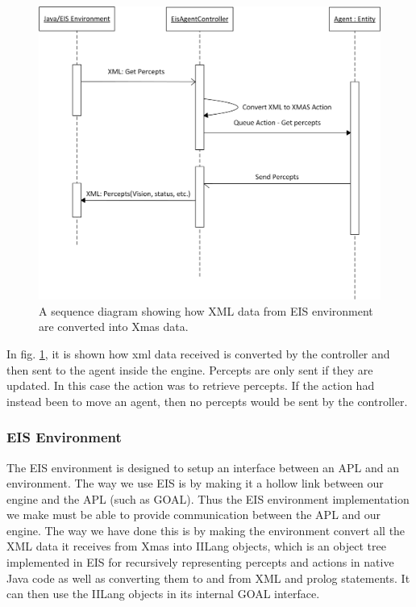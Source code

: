 \begin{figure}
\begin{centering}
\includegraphics[width=1\textwidth]{EisAgentControllerSequenceDiagram}
\par\end{centering}

\caption{A sequence diagram showing how XML data from EIS environment are converted
into Xmas data.\label{fig:EisAgentControllerSequenceDiagram}}


\end{figure}


In fig. \ref{fig:EisAgentControllerSequenceDiagram}, it is shown
how xml data received is converted by the controller and then sent
to the agent inside the engine. Percepts are only sent if they are
updated. In this case the action was to retrieve percepts. If the
action had instead been to move an agent, then no percepts would be
sent by the controller.


\subsubsection*{EIS Environment}

The EIS environment is designed to setup an interface between an APL
and an environment. The way we use EIS is by making it a hollow link
between our engine and the APL (such as GOAL). Thus the EIS environment
implementation we make must be able to provide communication between
the APL and our engine. The way we have done this is by making the
environment convert all the XML data it receives from Xmas into IILang
objects, which is an object tree implemented in EIS for recursively
representing percepts and actions in native Java code as well as converting
them to and from XML and prolog statements. It can then use the IILang
objects in its internal GOAL interface.

